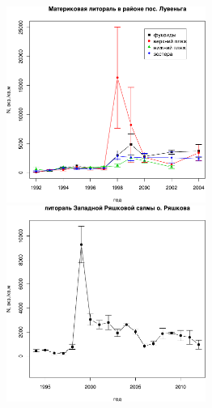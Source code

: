 \begin{figure}[p]


	\begin{minipage}[b]{.46\linewidth}
	\begin{center}
		\includegraphics[width=65mm]{../White_Sea//Luvenga_II_razrez/N_dynamic1.pdf}
	\end{center}
	\end{minipage}
%
	\hfil %
%
	\begin{minipage}[b]{.46\linewidth}
	\begin{center}
		\includegraphics[width=65mm]{../White_Sea/Ryashkov_ZRS/N_dynamic1.pdf}
	\end{center}
	\end{minipage}



\end{figure}
